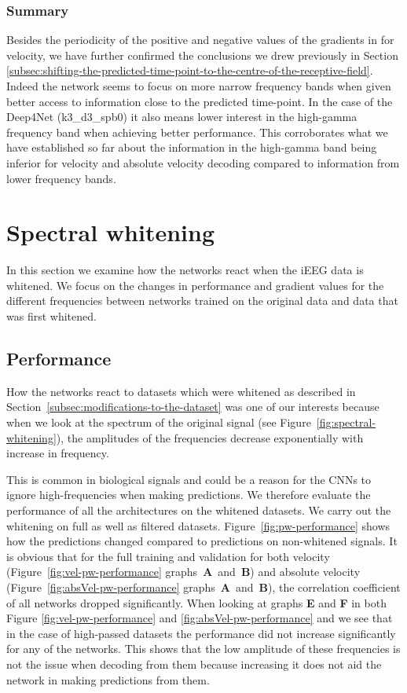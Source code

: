\subsubsection{Summary}\label{subsubsec:across-shiftig-summary}
Besides the periodicity of the positive and negative values of the gradients in for velocity, we have further confirmed the conclusions we drew previously in Section \ref{subsec:shifting-the-predicted-time-point-to-the-centre-of-the-receptive-field}. 
Indeed the network seems to focus on more narrow frequency bands when given better access to information close to the predicted time-point.
In the case of the Deep4Net (k3\_d3\_spb0) it also means lower interest in the high-gamma frequency band when achieving better performance.
This corroborates what we have established so far about the information in the high-gamma band being inferior for velocity and absolute velocity decoding compared to information from lower frequency bands. 


\section{Spectral whitening}\label{sec:spectral-whitening}

In this section we examine how the networks react when the iEEG data is whitened.
We focus on the changes in performance and gradient values for the different frequencies between networks trained on the original data and data that was first whitened.

\subsection{Performance}\label{subsec:pw-performance}
How the networks react to datasets which were whitened as described in Section~\ref{subsec:modifications-to-the-dataset} was one of our interests because when we look at the spectrum of the original signal (see Figure~\ref{fig:spectral-whitening}), the amplitudes of the frequencies decrease exponentially with increase in frequency.

This is common in biological signals and could be a reason for the CNNs to ignore high-frequencies when making predictions.
We therefore evaluate the performance of all the architectures on the whitened datasets. 
We carry out the whitening on full as well as filtered datasets. 
Figure~\ref{fig:pw-performance} shows how the predictions changed compared to predictions on non-whitened signals.
It is obvious that for the full training and validation for both velocity (Figure~\ref{fig:vel-pw-performance} graphs~\textbf{A}~and~\textbf{B}) and absolute velocity (Figure~\ref{fig:absVel-pw-performance} graphs~\textbf{A}~and~\textbf{B}), the correlation coefficient of all networks dropped significantly.
When looking at graphs \textbf{E} and \textbf{F} in both Figure \ref{fig:vel-pw-performance} and \ref{fig:absVel-pw-performance} and we see that in the case of high-passed datasets the performance did not increase significantly for any of the networks. 
This shows that the low amplitude of these frequencies is not the issue when decoding from them because increasing it does not aid the network in making predictions from them. \\

